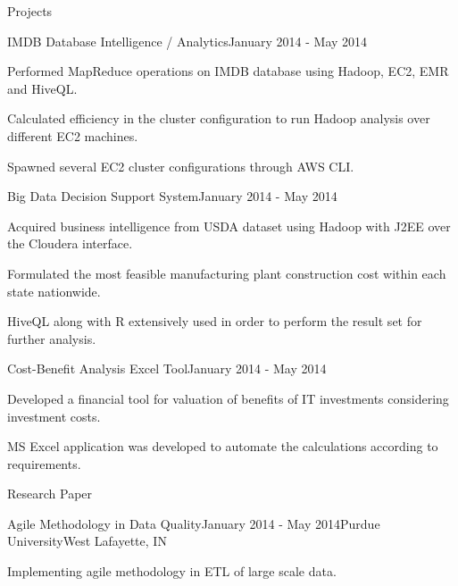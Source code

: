 \documentclass{resume} %
\begin{document}
\begin{rSection}{Projects}
\begin{rSubsection}{IMDB Database Intelligence / Analytics}{January 2014 - May 2014}{}{}
\item Performed MapReduce operations on IMDB database using Hadoop, EC2, EMR and HiveQL.
\item Calculated efficiency in the cluster configuration to run Hadoop analysis over different EC2 machines.
\item Spawned several EC2 cluster configurations through AWS CLI.
\end{rSubsection}

\begin{rSubsection}{Big Data Decision Support System}{January 2014 - May 2014}{}{}
\item Acquired business intelligence from USDA dataset using Hadoop with J2EE over the Cloudera interface.
\item Formulated the most feasible manufacturing plant construction cost within each state nationwide.
\item HiveQL along with R extensively used in order to perform the result set for further analysis.
\end{rSubsection}

\begin{rSubsection}{Cost-Benefit Analysis Excel Tool}{January 2014 - May 2014}{}{}
\item Developed a financial tool for valuation of benefits of IT investments considering investment costs.
\item MS Excel application was developed to automate the calculations according to requirements.
\end{rSubsection}

\end{rSection}




\begin{rSection}{Research Paper}


\begin{rSubsection}{Agile Methodology in Data Quality}{January 2014 - May 2014}{Purdue University}{West Lafayette, IN}
\item Implementing agile methodology in ETL of large scale data.
\end{rSubsection}

\end{rSection}
\end{document}
